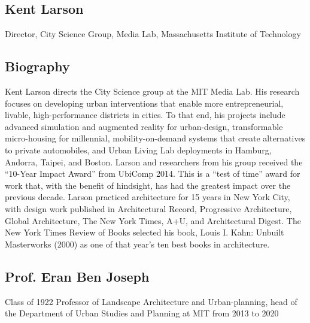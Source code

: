
\subsection*{Kent Larson}

{
    Director, City Science Group, Media Lab, Massachusetts Institute of Technology
}

\subsection*{Biography}

{
    Kent Larson directs the City Science group at the MIT Media Lab. His research focuses on developing urban interventions that enable more entrepreneurial, livable, high-performance districts in cities. To that end, his projects include advanced simulation and augmented reality for urban-design, transformable micro-housing for millennial, mobility-on-demand systems that create alternatives to private automobiles, and Urban Living Lab deployments in Hamburg, Andorra, Taipei, and Boston. Larson and researchers from his group received the “10-Year Impact Award” from UbiComp 2014. This is a “test of time” award for work that, with the benefit of hindsight, has had the greatest impact over the previous decade. Larson practiced architecture for 15 years in New York City, with design work published in Architectural Record, Progressive Architecture, Global Architecture, The New York Times, A+U, and Architectural Digest. The New York Times Review of Books selected his book, Louis I. Kahn: Unbuilt Masterworks (2000) as one of that year's ten best books in architecture.
}



\subsection*{Prof. Eran Ben Joseph}

{
    Class of 1922 Professor of Landscape Architecture and Urban-planning, head of the Department of Urban Studies and Planning at MIT from 2013 to 2020
}
% 
